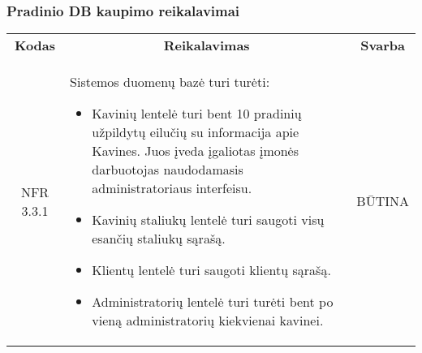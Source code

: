 \documentclass{VUMIFPSkursinis}
\begin{document}
\subsubsection{Pradinio DB kaupimo reikalavimai}
\begin{center}
	\begin{table}[H]
	\begin{tabular}{|p{2cm}|p{}|p{}|}
	\hline
	    \rowcolor{lightgray}
		\multicolumn{3}{|c|}{Pradinio DB kaupimo reikalavimai}\\
		
	\hline
		\multicolumn{1}{|c|}{{\bfseries Kodas}}&
		\multicolumn{1}{|c|}{{\bfseries Reikalavimas}}&
		\multicolumn{1}{|c|}{{\bfseries Svarba}}\\
	\hline 	
		\multicolumn{1}{|c|}{NFR 3.3.1}&
		{Sistemos duomenų bazė turi turėti:
			\begin{itemize}
				\item Kavinių lentelė turi bent 10 pradinių užpildytų eilučių su informacija apie Kavines. Juos įveda įgaliotas įmonės darbuotojas naudodamasis administratoriaus interfeisu.
				\item Kavinių staliukų lentelė turi saugoti visų esančių staliukų sąrašą.
				\item Klientų lentelė turi saugoti klientų sąrašą.
				\item Administratorių lentelė turi turėti bent po vieną administratorių kiekvienai kavinei.
			\end{itemize}}&
		\multicolumn{1}{|c|}{BŪTINA}\\	
	
	\hline 	
	
	\end{tabular}
	\end{table}

\end{center}
\end{document}
